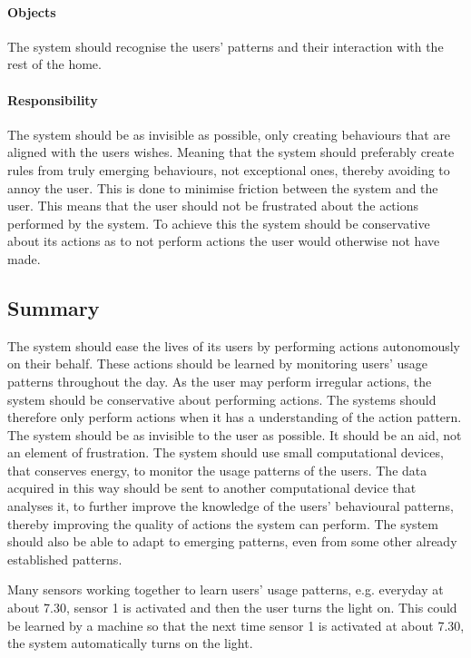 \paragraph{Objects}
The system should recognise the users' patterns and their interaction with the rest of the home.

\paragraph{Responsibility}
The system should be as invisible as possible, only creating behaviours that are aligned with the users wishes. Meaning that the system should preferably create rules from truly emerging behaviours, not exceptional ones, thereby avoiding to annoy the user. This is done to minimise friction between the system and the user. This means that the user should not be frustrated about the actions performed by the system. To achieve this the system should be conservative about its actions as to not perform actions the user would otherwise not have made.

\subsection{Summary}
The system should ease the lives of its users by performing actions autonomously on their behalf. These actions should be learned by monitoring users' usage patterns throughout the day. As the user may perform irregular actions, the system should be conservative about performing actions. The systems should therefore only perform actions when it has a understanding of the action pattern. The system should be as invisible to the user as possible. It should be an aid, not an element of frustration. The system should use small computational devices, that conserves energy, to monitor the usage patterns of the users. The data acquired in this way should be sent to another computational device that analyses it, to further improve the knowledge of the users' behavioural patterns, thereby improving the quality of actions the system can perform. The system should also be able to adapt to emerging patterns, even from some other already established patterns.

Many sensors working together to learn users’ usage patterns, e.g. everyday at about 7.30, sensor 1 is activated and then the user turns the light on. This could be learned by a machine so that the next time sensor 1 is activated at about 7.30, the system automatically turns on the light.

